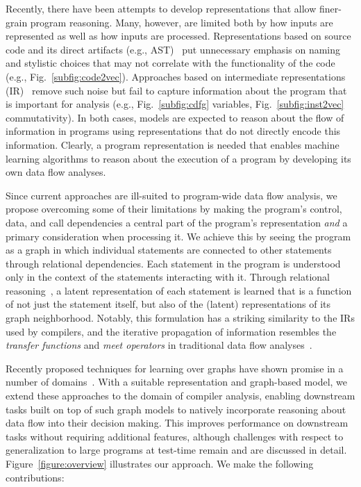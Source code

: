 Recently, there have been attempts to develop representations that allow
finer-grain program reasoning. Many, however, are limited both by how inputs are
represented as well as how inputs are processed. Representations based on source
code and its direct artifacts (e.g.,
AST)~\citep{Alon2018a,Yin2018,Haj-Ali2019,cummins2017synthesizing} put
unnecessary emphasis on naming and stylistic choices that may not correlate with
the functionality of the code (e.g., Fig.~\ref{subfig:code2vec}). Approaches
based on intermediate representations
(IR)~\citep{Ben-nun2018,Mirhoseini2017,Brauckmann2020} remove such noise but
fail to capture information about the program that is important for analysis
(e.g.,  Fig.~\ref{subfig:cdfg} variables, Fig.~\ref{subfig:inst2vec}
commutativity). In both cases, models are expected to reason about the flow of
information in programs using representations that do not directly encode this
information. Clearly, a program representation is needed that enables machine
learning algorithms to reason about the execution of a program by developing its
own data flow analyses.

Since current approaches are ill-suited to program-wide data flow analysis, we
propose overcoming some of their limitations by making the program's control,
data, and call dependencies a central part of the program's representation
\emph{and} a primary consideration when processing it. We achieve this by seeing
the program as a graph in which individual statements are connected to other
statements through relational dependencies. Each statement in the program is
understood only in the context of the statements interacting with it. Through
relational reasoning~\citep{Battaglia2018}, a latent representation of each
statement is learned that is a function of not just the statement itself, but
also of the (latent) representations of its graph neighborhood. Notably, this
formulation has a striking similarity to the IRs used by compilers, and the
iterative propagation of information resembles the \emph{transfer functions} and
\emph{meet operators} in traditional data flow analyses~\citep{Kildall1973}.

Recently proposed techniques for learning over graphs have shown promise in a
number of domains~\citep{Li2018a}. With a suitable representation and
graph-based model, we extend these approaches to the domain of compiler
analysis, enabling downstream tasks built on top of such graph models to
natively incorporate reasoning about data flow into their decision making. This
improves performance on downstream tasks without requiring additional features,
although challenges with respect to generalization to large programs at
test-time remain and are discussed in detail. Figure~\ref{figure:overview}
illustrates our approach. We make the following contributions:

